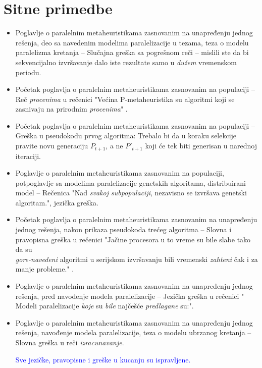 \documentclass[a4paper]{report}
\newcommand{\odgovor}[1]{\textcolor{blue}{#1}}
\begin{document}
\section{Sitne primedbe}

\begin{itemize}
    \item {Poglavlje o paralelnim metaheuristikama zasnovanim na unapređenju
jednog rešenja, deo sa navedenim modelima paralelizacije u tezama, teza o modelu paralelizma kretanja -- Slučajna greška sa pogrešnom reči -- mislili ste da bi sekvencijalno izvršavanje dalo iste rezultate samo u \textit{dužem} vremenskom periodu.} 
    \item{ Početak poglavlja o paralelnim metaheuristikama zasnovanim na populaciji -- Reč \textit{procenima} u rečenici "Većina P-metaheuristika su algoritmi koji se zasnivaju na prirodnim
\textit{procenima}" .}
    \item{ Početak poglavlja o paralelnim metaheuristikama zasnovanim na populaciji -- Greška u pseudokodu prvog algoritma: Trebalo bi da u koraku selekcije pravite novu generaciju $P_{t+1}$, a ne $P'_{t+1}$ koji će tek biti generisan u narednoj iteraciji.}
    \item{ Poglavlje o paralelnim metaheuristikama zasnovanim na populaciji, potpoglavlje sa modelima paralelizacije genetskih algoritama, distribuirani model -- Rečenica "Nad \textit{svakoj subpopulaciji}, nezavisno se izvršava genetski algoritam.", jezička greška.}
    \item{ Početak poglavlja o paralelnim metaheuristikama zasnovanim na unapređenju jednog rešenja, nakon prikaza pseudokoda trećeg algoritma -- Slovna i pravopisna greška u rečenici "Jačine procesora u to vreme su bile slabe tako da
su \\ \textit{gore-navedeni} algoritmi u serijskom izvršavanju bili vremenski \textit{zahteni}
čak i za manje probleme." .}
    \item{Poglavlje o paralelnim metaheuristikama zasnovanim na unapređenju
jednog rešenja, pred navođenje modela paralelizacije -- Jezička greška u rečenici "
Modeli paralelizacije \textit{koje} su \textit{bile} najčešće \textit{predlagane} su:".}
    \item{Poglavlje o paralelnim metaheuristikama zasnovanim na unapređenju
jednog rešenja, navođenje modela paralelizacije, teza o modelu ubrzanog kretanja -- Slovna greška u reči \textit{izracunavanje}.}

\odgovor{Sve jezičke, pravopisne i greške u kucanju su ispravljene.}
\end{itemize}
\end{document}
